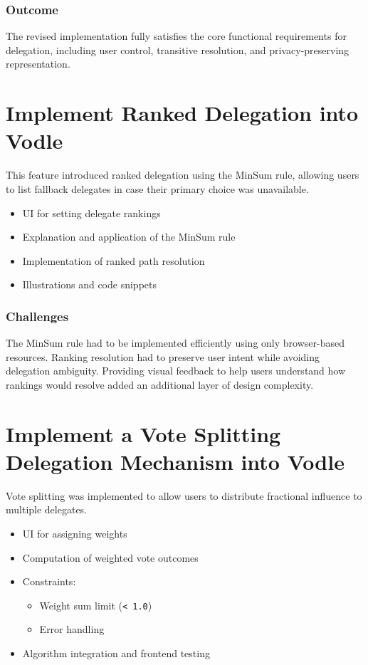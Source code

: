 \subsubsection{Outcome}
The revised implementation fully satisfies the core functional requirements for delegation, including user control, transitive resolution, and privacy-preserving representation.

\section{Implement Ranked Delegation into Vodle}
This feature introduced ranked delegation using the MinSum rule, allowing users to list fallback delegates in case their primary choice was unavailable.

\begin{itemize}
  \item UI for setting delegate rankings
  \item Explanation and application of the MinSum rule
  \item Implementation of ranked path resolution
  \item Illustrations and code snippets
\end{itemize}

\subsubsection{Challenges}
The MinSum rule had to be implemented efficiently using only browser-based resources. Ranking resolution had to preserve user intent while avoiding delegation ambiguity. Providing visual feedback to help users understand how rankings would resolve added an additional layer of design complexity.

\section{Implement a Vote Splitting Delegation Mechanism into Vodle}
Vote splitting was implemented to allow users to distribute fractional influence to multiple delegates.

\begin{itemize}
  \item UI for assigning weights
  \item Computation of weighted vote outcomes
  \item Constraints:
  \begin{itemize}
    \item Weight sum limit (\texttt{< 1.0})
    \item Error handling
  \end{itemize}
  \item Algorithm integration and frontend testing
\end{itemize}

